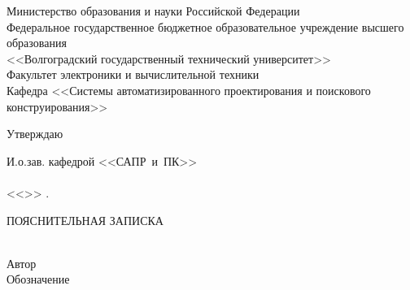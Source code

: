 \begin{titlepage}
    \begin{center}
        Министерство образования и науки Российской Федерации \\
        \vspace{.5cm}
        Федеральное государственное бюджетное образовательное учреждение высшего образования\\
        <<Волгоградский государственный технический университет>>\\
        Факультет электроники и вычислительной техники\\
        \vspace{.5cm}
        Кафедра <<Системы автоматизированного проектирования и поискового конструирования>>
        \vspace{.5cm}
    \end{center}
    \begin{flushright}
        \begin{center}
            \hspace*{10.5em}Утверждаю
        \end{center}
        И.о.зав. кафедрой <<САПР~и~ПК>>\\
        \quad{}\\
        <<\underline{\hspace{2em}}>> \underline{\hspace{8em}} \the{}.
    \end{flushright}
    \begin{center}
        \large ПОЯСНИТЕЛЬНАЯ ЗАПИСКА\\
            {}\\
        \vspace{10pt}\underline{\hspace{\textwidth}}
        \underline{\hspace{\textwidth}}
    \end{center}
    Автор  \quad 
    \\
    Обозначение 

\end{titlepage}
